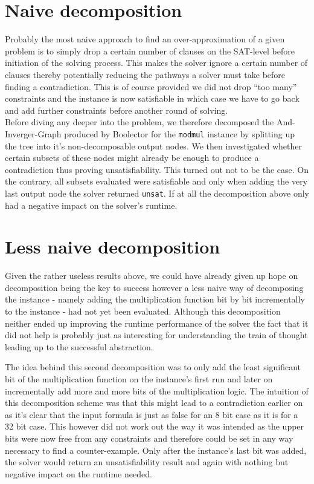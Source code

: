 \section{Naive decomposition}
Probably the most naive approach to find an over-approximation of a given problem is to simply drop a certain number of clauses on the SAT-level before initiation of the solving process. This makes the solver ignore a certain number of clauses thereby potentially reducing the pathways a solver must take before finding a contradiction. This is of course provided we did not drop \enquote{too many} constraints and the instance is now satisfiable in which case we have to go back and add further constraints before another round of solving.\\
Before diving any deeper into the problem, we therefore decomposed the And-Inverger-Graph \cite{Biere-FMV-TR-11-2-AIGER}  produced by Boolector for the \texttt{modmul} instance by splitting up the tree into it's non-decomposable output nodes. We then investigated whether certain subsets of these nodes might already be enough to produce a contradiction thus proving unsatisfiability. This turned out not to be the case. On the contrary, all subsets evaluated were satisfiable and only when adding the very last output node the solver returned \texttt{unsat}. If at all the decomposition above only had a negative impact on the solver's runtime.

\section{Less naive decomposition}

Given the rather useless results above, we could have already given up hope on decomposition being the key to success however a less naive way of decomposing the instance - namely adding the multiplication function bit by bit incrementally to the instance - had not yet been evaluated. Although this decomposition neither ended up improving the runtime performance of the solver the fact that it did not help is probably just as interesting for understanding the train of thought leading up to the successful abstraction. 
\par
The idea behind this second decomposition was to only add the least significant bit of the multiplication function on the instance's first run and later on incrementally add more and more bits of the multiplication logic. The intuition of this decomposition scheme was that this might lead to a contradiction earlier on as it's clear that the input formula is just as false for an 8 bit case as it is for a 32 bit case. This however did not work out the way it was intended as the upper bits were now free from any constraints and therefore could be set in any way necessary to find a counter-example. Only after the instance's last bit was added, the solver would return an unsatisfiability result and again with nothing but negative impact on the runtime needed.

